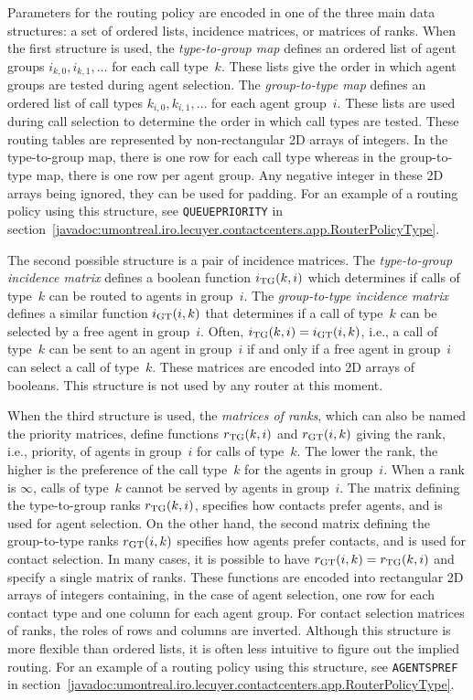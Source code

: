 Parameters for the routing policy are encoded in one of the three main data
structures: a set of ordered lists,
incidence matrices, or matrices of ranks.  When the first
structure is used, the
\emph{type-to-group map} defines an ordered list of agent groups
$i_{k, 0}, i_{k, 1}, \ldots$ for each call type~$k$.  These lists give the order
in which agent groups are tested during agent selection.
The \emph{group-to-type map} defines an ordered list
of call types $k_{i, 0}, k_{i, 1}, \ldots$ for each agent group~$i$.  These lists
are used during call selection to determine the order in which
call types are tested.
These routing tables are represented by non-rectangular 2D arrays of integers.
In the type-to-group map, there is one row for each call type whereas
in the group-to-type map, there is one row per agent group.
Any negative integer
in these 2D arrays being ignored, they can be used for padding.
For an example of a routing policy using this structure, see
\texttt{QUEUEPRIORITY} in
section~\ref{javadoc:umontreal.iro.lecuyer.contactcenters.app.RouterPolicyType}.

The second possible structure is a pair of incidence matrices.
The \emph{type-to-group incidence matrix}
defines a
boolean function $i_{\mathrm{TG}}(k, i)$ which determines if
calls of type~$k$ can be routed to agents in group~$i$.
The \emph{group-to-type incidence matrix}
defines a similar function
$i_{\mathrm{GT}}(i, k)$ that determines if a call of type~$k$ can be selected
by a free agent in group~$i$.
Often, $i_{\mathrm{TG}}(k, i)=i_{\mathrm{GT}}(i, k)$, i.e., a call of type~$k$ can be sent
to an agent in group~$i$ if and only if a free agent in group~$i$
can select a call of type~$k$.
These matrices are encoded into 2D arrays of booleans.
This structure is not used by any router at this moment.

When the third structure is used,
the \emph{matrices of ranks}, which can also be named the priority matrices,
define functions
$\rTG(k, i)$ and
$\rGT(i, k)$ giving the rank, i.e., priority,
of agents in group~$i$ for calls of type~$k$.  The lower the rank, the
higher is the preference of the call type~$k$ for the agents in
group~$i$.  When a rank is
$\infty$, calls of type~$k$ cannot be served
by agents in group~$i$.
The matrix defining the
type-to-group ranks
$\rTG(k, i)$,
specifies how
contacts prefer agents, and is used for agent selection.
On the other hand,
the second matrix
defining the group-to-type ranks
$\rGT(i, k)$ specifies how agents prefer
contacts, and is used for contact selection.
In many cases, it is possible to have $\rGT(i, k)=\rTG(k, i)$ and
specify a single matrix of ranks.
These functions are encoded into rectangular 2D arrays of integers
containing, in the case of agent selection,
one row for  each contact type and one
column for each agent group.  For contact selection matrices of ranks,
the roles of rows and columns are inverted.
Although this structure is more flexible than ordered lists, it is
often less intuitive
to figure out the implied routing.
For an example of a routing policy using this structure, see
\texttt{AGENTSPREF} in
section~\ref{javadoc:umontreal.iro.lecuyer.contactcenters.app.RouterPolicyType}.

